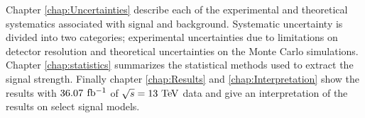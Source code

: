 \indent Chapter \ref{chap:Uncertainties} describe each of the experimental and theoretical systematics associated with signal and background.  Systematic uncertainty is divided into two categories; experimental uncertainties due to limitations on detector resolution and theoretical uncertainties on the Monte Carlo simulations. \\

\indent Chapter \ref{chap:statistics} summarizes the statistical methods used to extract the signal strength.  Finally chapter \ref{chap:Results} and \ref{chap:Interpretation} show the results with $36.07$ $\mbox{fb$^{-1}$}$ of $\sqrt{s} = 13 \tev$ data and give an interpretation of the results on select signal models.  \\




